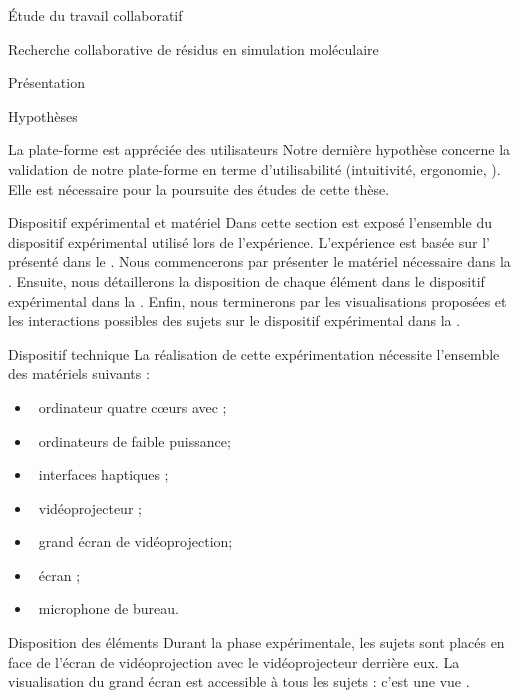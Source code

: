 \documentclass[myfrancais]{mythesis}
\begin{document}
\begin{mypart}{Étude du travail collaboratif}
\begin{mychapter}{Recherche collaborative de résidus en simulation moléculaire}
\begin{mysection}{Présentation}
\begin{mysubsection}{Hypothèses}
\begin{myparagraph}{ La plate-forme est appréciée des utilisateurs}
						Notre dernière hypothèse concerne la validation de notre plate-forme en terme d'utilisabilité (intuitivité, ergonomie, \myetc).
						Elle est nécessaire pour la poursuite des études de cette thèse.
					\end{myparagraph}
				\end{mysubsection}
			\end{mysection}
			\begin{mysection}{Dispositif expérimental et matériel}
				Dans cette section est exposé l'ensemble du dispositif expérimental utilisé lors de l'expérience.
				L'expérience est basée sur l' présenté dans le .
				Nous commencerons par présenter le matériel nécessaire dans la .
				Ensuite, nous détaillerons la disposition de chaque élément dans le dispositif expérimental dans la .
				Enfin, nous terminerons par les visualisations proposées et les interactions possibles des sujets sur le dispositif expérimental dans la .
				\begin{mysubsection}{Dispositif technique}
					La réalisation de cette expérimentation nécessite l'ensemble des matériels suivants :
					\begin{itemize}
						\item {}~ordinateur quatre cœurs \myIntelCore avec ;
						\item {}~ordinateurs de faible puissance;
						\item {}~interfaces haptiques \myOmni;
						\item {}~vidéoprojecteur \myCasioXJ;
						\item {}~grand écran de vidéoprojection;
						\item {}~écran \myLCD {};
						\item {}~microphone de bureau.
					\end{itemize}
				\end{mysubsection}
				\begin{mysubsection}{Disposition des éléments}
					Durant la phase expérimentale, les sujets sont placés en face de l'écran de vidéoprojection avec le vidéoprojecteur derrière eux.
					La visualisation du grand écran est accessible à tous les sujets : c'est une vue .

\end{mysubsection}
\end{mysection}
\end{mychapter}
\end{mypart}
\end{document}
